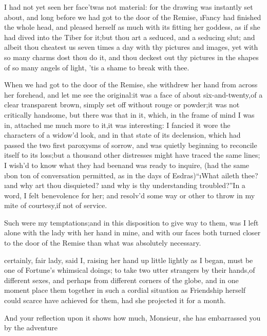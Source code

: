 \documentclass[twoside]{article}
\begin{document}
I had not yet seen her face\tsk ’twas not material: for the drawing was
instantly set about, and long before we had got to the door of the
Remise, \i{Fancy} had finished the whole head, and pleased herself as much
with its fitting her goddess, as if she had dived into the Tiber for
it;\tsk but thou art a seduced, and a seducing slut; and albeit thou cheatest
us seven times a day with thy pictures and images, yet with so many
charms dost thou do it, and thou deckest out thy pictures in the shapes
of so many angels of light, ’tis a shame to break with thee.

When we had got to the door of the Remise, she withdrew her hand from
across her forehead, and let me see the original:\tsk it was a face of about
six-and-twenty,\tsk of a clear transparent brown, simply set off without
rouge or powder;\tsk it was not critically handsome, but there was that in
it, which, in the frame of mind I was in, attached me much more to it,\tsk it
was interesting: I fancied it wore the characters of a widow’d look, and
in that state of its declension, which had passed the two first paroxysms
of sorrow, and was quietly beginning to reconcile itself to its loss;\tsk but
a thousand other distresses might have traced the same lines; I wish’d to
know what they had been\tsk and was ready to inquire, (had the same \i{bon ton}
of conversation permitted, as in the days of Esdras)\tsk “\i{What aileth thee}?
\i{and why art thou disquieted}? \i{and why is thy understanding
troubled}?”\tsk In a word, I felt benevolence for her; and resolv’d some way
or other to throw in my mite of courtesy,\tsk if not of service.

Such were my temptations;\tsk and in this disposition to give way to them,
was I left alone with the lady with her hand in mine, and with our faces
both turned closer to the door of the Remise than what was absolutely
necessary.






 certainly, fair lady, said I, raising her hand up little lightly as
I began, must be one of Fortune’s whimsical doings; to take two utter
strangers by their hands,\tsk of different sexes, and perhaps from different
corners of the globe, and in one moment place them together in such a
cordial situation as Friendship herself could scarce have achieved for
them, had she projected it for a month.

\tsk And your reflection upon it shows how much, Monsieur, she has
embarrassed you by the adventure\tsk 
\end{document}
